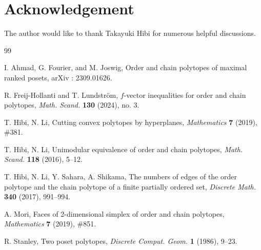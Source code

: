 \documentclass[12pt]{amsart}
\theoremstyle{definition}
\begin{document}
\section*{Acknowledgement}
The author would like to thank Takayuki Hibi for numerous helpful discussions.

\medskip
\begin{thebibliography}{99}



I. Ahmad, G. Fourier, and M. Joswig, 
Order and chain polytopes of maximal ranked posets, arXiv : 2309.01626.


R. Freij-Hollanti and T. Lundstr\"{o}m, 
$f$-vector inequalities for order and chain polytopes, 
{\em Math. Scand.} {\bf 130} (2024), no. 3.

T. Hibi, N. Li,
Cutting convex polytopes by hyperplanes,
{\em Mathematics} {\bf 7} (2019), \#381.


T. Hibi, N. Li, 
Unimodular equivalence of order and chain polytopes, 
{\em Math. Scand.} {\bf 118} (2016), 5--12.


T. Hibi, N. Li, Y. Sahara, A. Shikama, 
The numbers of edges of the order polytope and the chain polytope of a finite partially ordered set, 
{\em Discrete Math.} {\bf 340} (2017), 991--994.


A. Mori, 
Faces of 2-dimensional simplex of order and chain polytopes,
{\em Mathematics} {\bf 7} (2019), \#851.


R. Stanley, 
Two poset polytopes, 
{\em Discrete Comput. Geom.} {\bf 1} (1986), 9--23.

\end{thebibliography}
\end{document}
